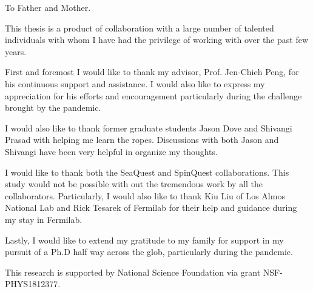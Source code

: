 \documentclass[../main.tex]{subfiles}
\begin{document}
\begin{dedication}
	To Father and Mother.
\end{dedication}

\begin{acknowledgments}
	This thesis is a product of collaboration with a large number of talented
	individuals with whom I have had the privilege of working with over the past
	few years.

	First and foremost I would like to thank my advisor, Prof. Jen-Chieh Peng, for
	his continuous support and assistance. I would also like to express my
	appreciation for his efforts and encouragement particularly during the
	challenge brought by the pandemic.

	I would also like to thank former graduate students Jason Dove and Shivangi
	Prasad with helping me learn the ropes. Discussions with both Jason and
	Shivangi have been very helpful in organize my thoughts.

	I would like to thank both the SeaQuest and SpinQuest collaborations.
	This study would not be possible with out the tremendous work by all the
	collaborators. Particularly, I would also like to thank Kiu Liu of Los Almos
	National Lab and Rick Tesarek of Fermilab for their help and guidance during my
	stay in Fermilab.

	Lastly, I would like to extend my gratitude to my family for support in my
	pursuit of a Ph.D half way across the glob, particularly during the pandemic.

	This research is supported by National Science Foundation via grant NSF-PHYS1812377.

\end{acknowledgments}
\end{document}
